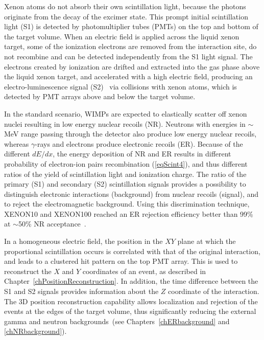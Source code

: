 
Xenon atoms do not absorb their own scintillation light, because the photons originate from the decay of the excimer state. This prompt initial scintillation light (S1) is detected by photomultiplier tubes (PMTs) on the top and bottom of the target volume. 
When an electric field is applied across the liquid xenon target, some of the ionization electrons are removed from the interaction site, do not recombine and can be detected independently from the S1 light signal. The electrons created by ionization are drifted and extracted into the gas phase above the liquid xenon target, and accelerated with a high electric field, producing an electro-luminescence signal (S2)~\cite{S2} via collisions with xenon atoms, which is detected by PMT arrays above and below the target volume. 

In the standard scenario, WIMPs are expected to elastically scatter off xenon nuclei resulting in low energy nuclear recoils (NR). Neutrons with energies in $\sim$MeV range passing through the detector also produce low energy nuclear recoils, whereas $\gamma$-rays and electrons produce electronic recoils (ER). 
Because of the different $dE/dx$, the energy deposition of NR and ER results in different probability of electron-ion pairs recombination (\ref{eqScint4}), and thus different ratios of the yield of scintillation light and ionization charge. The ratio of the primary (S1) and secondary (S2) scintillation signals provides a possibility to distinguish electronic interactions (background) from nuclear recoils (signal), and to reject the electromagnetic background. Using this discrimination technique, XENON10 and XENON100 reached an ER rejection efficiency better than 99\% at $\sim$50\% NR acceptance~\cite{xe10-independent, xe100-run07}.

In a homogeneous electric field, the position in the $XY$ plane at which the proportional scintillation occurs is correlated with that of the original interaction, and leads to a clustered hit pattern on the top PMT array. This is used to reconstruct the $X$ and $Y$ coordinates of an event, as described in Chapter~\ref{chPositionReconstruction}. 
In addition, the time difference between the S1 and S2 signals provides information about the $Z$ coordinate of the interaction. The 3D position reconstruction capability allows localization and rejection of the events at the edges of the target volume, thus significantly reducing the external gamma and neutron backgrounds~(see Chapters~\ref{chERbackground} and \ref{chNRbackground}).

